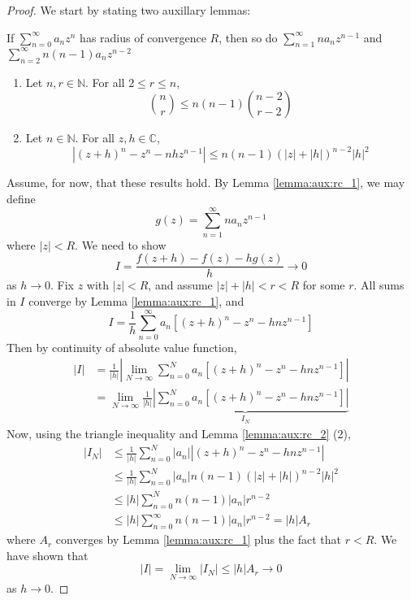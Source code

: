 \documentclass[10pt, a4paper, twoside]{report}
\begin{document}
\begin{proof} We start by stating two auxillary lemmas:
    \begin{lemma}
        If \(\sum_{n=0}^{\infty}a_nz^n\) has radius of convergence \(R\), then so do \(\sum_{n=1}^{\infty}na_nz^{n-1}\) \newline and  \(\sum_{n=2}^{\infty}n(n-1)a_nz^{n-2}\)
        \label{lemma:aux:rc_1}
    \end{lemma}
    \begin{lemma}\item[]
        \begin{enumerate} 
            \item Let \(n,r\in\mathbb{N}\). For all \( 2\leq r\leq n \),
            \[\binom nr\leq n(n-1)\binom{n-2}{r-2}\]
            \item Let \(n\in\mathbb{N}\). For all \(z,h\in\mathbb{C}\),
            \[|(z+h)^n-z^n-nhz^{n-1}|\leq n(n-1)(|z|+|h|)^{n-2}|h|^2\]
        \end{enumerate}
        \label{lemma:aux:rc_2}
    \end{lemma}
    Assume, for now, that these results hold. By Lemma \ref{lemma:aux:rc_1}, we may define 
    \[g(z)=\sum_{n=1}^{\infty}na_nz^{n-1}\]
    where \(|z|<R\). We need to show 
    \[I=\frac{f(z+h)-f(z)-hg(z)}{h}\to 0\]
    as \(h\to 0\). Fix \(z\) with \(|z|<R\), and assume \(|z|+|h|<r<R\) for some \(r\). All sums in \(I\) converge by Lemma \ref{lemma:aux:rc_1}, and 
    \[I=\frac 1h\sum_{n=0}^\infty a_n[(z+h)^n-z^n-hnz^{n-1}]\]
    Then by continuity of absolute value function,
    \begin{align*}
        |I|&=\frac 1{|h|}\left|\lim_{N\to\infty}\sum_{n=0}^{N} a_n[(z+h)^n-z^n-hnz^{n-1}]\right| \\
        &=\lim_{N\to\infty}\underbrace{\frac 1{|h|}\left|\sum_{n=0}^{N} a_n[(z+h)^n-z^n-hnz^{n-1}]\right|}_{I_N}
    \end{align*}
    Now, using the triangle inequality and Lemma \ref{lemma:aux:rc_2} (2), 
    \begin{align*}
        |I_N|&\leq\frac 1{|h|}\sum_{n=0}^{N}|a_n||(z+h)^n-z^n-hnz^{n-1}| \\
        &\leq\frac 1{|h|}\sum_{n=0}^{N}|a_n|n(n-1)(|z|+|h|)^{n-2}|h|^2 \\
        &\leq |h|\sum_{n=0}^{N}n(n-1)|a_n|r^{n-2} \\
        &\leq |h|\sum_{n=0}^\infty n(n-1)|a_n|r^{n-2} =|h|A_r
    \end{align*}
    where \(A_r\) converges by Lemma \ref{lemma:aux:rc_1} plus the fact that \(r<R\). We have shown that 
    \[|I|=\lim_{N\to\infty}|I_N|\leq|h|A_r\to 0\]
    as \(h\to 0\).
\end{proof}
\end{document}

